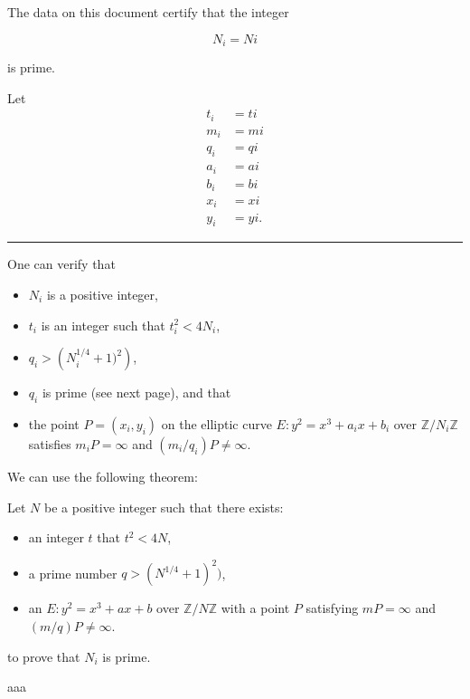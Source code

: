 \pagestyle{empty}
\phantom{a}
\vspace{2em}

\begin{center}
{\Huge {}}
\end{center}
\vspace{2em}

\noindent The data on this document certify that the integer

{\tiny
$$
N_{ {{ i }} } = {{ Ni }}
$$
}

\noindent is prime.

\vspace{2em}

\noindent Let
{\tiny
\begin{align*}
t_{ {{ i }} } &= {{ ti }} \\
m_{ {{ i }} } &= {{ mi }} \\
q_{ {{ i }} } &= {{ qi }} \\
a_{ {{ i }} } &= {{ ai }} \\
b_{ {{ i }} } &= {{ bi }} \\
x_{ {{ i }} } &= {{ xi }} \\
y_{ {{ i }} } &= {{ yi }}.
\end{align*}
}

\vspace{0.5em}
\hrule
\vspace{0.5em}

\begin{multicols}{3}
\noindent One can verify that
\begin{itemize}
\item $N_{ {{ i }} }$ is a positive integer,
\item $t_{ {{ i }} }$ is an integer such that $t_{ {{ i }} }^2 < 4N_{ {{ i }} }$,
\item $q_{ {{ i }} } > \left(N_{ {{ i }} }^{1/4} + 1)^2\right)$,
\item $q_{ {{ i }} }$ is prime (see next page), and that
\item the point $P = (x_{ {{ i }} }, y_{ {{ i }} })$ on the elliptic curve $E: y^2 = x^3 + a_{ {{ i }} }x + b_{ {{ i }} }$ over $\mathbb{Z}/{N_{ {{ i }} }}\mathbb{Z}$ satisfies $m_{ {{ i }} }P = \infty$ and $(m_{ {{ i }} }/q_{ {{ i }} })P \neq \infty$.
\end{itemize}
\columnbreak
\noindent We can use the following theorem:
\begin{theorem*}
Let $N$ be a positive integer such that there exists:
\begin{itemize}
\item an integer $t$ that $t^2 < 4N$,
\item a prime number $q > (N^{1/4} + 1)^2)$,
\item an $E: y^2 = x^3 + ax + b$ over $\mathbb{Z}/{N}\mathbb{Z}$ with a point $P$ satisfying $mP = \infty$ and $(m/q)P \neq \infty$.
\end{itemize}
\end{theorem*}
\noindent to prove that $N_{ {{ i }} }$ is prime.

\columnbreak

aaa
\end{multicols}

\newpage